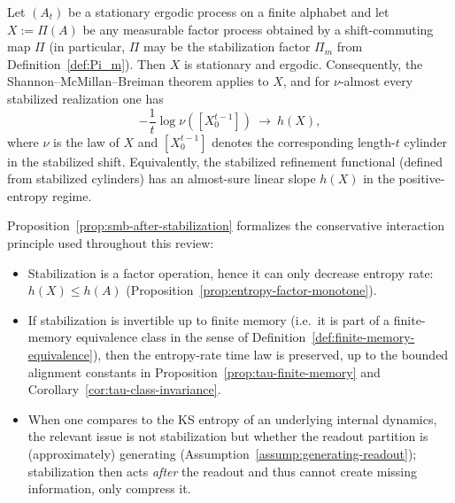 \begin{proposition}\label{prop:smb-after-stabilization}
Let $(A_t)$ be a stationary ergodic process on a finite alphabet and let \(X:=\Pi(A)\) be any measurable factor process obtained by a shift-commuting map \(\Pi\) (in particular, \(\Pi\) may be the stabilization factor \(\Pi_m\) from Definition~\ref{def:Pi_m}).
Then \(X\) is stationary and ergodic.
Consequently, the Shannon--McMillan--Breiman theorem applies to \(X\), and for \(\nu\)-almost every stabilized realization one has
\[
-\frac{1}{t}\log \nu([X_0^{t-1}])\ \longrightarrow\ h(X),
\]
where \(\nu\) is the law of \(X\) and \([X_0^{t-1}]\) denotes the corresponding length-\(t\) cylinder in the stabilized shift.
Equivalently, the stabilized refinement functional (defined from stabilized cylinders) has an almost-sure linear slope \(h(X)\) in the positive-entropy regime.
\end{proposition}

\begin{remark}\label{rem:stabilization-smb-ks}
Proposition~\ref{prop:smb-after-stabilization} formalizes the conservative interaction principle used throughout this review:
\begin{itemize}[leftmargin=*,itemsep=2pt]
  \item Stabilization is a factor operation, hence it can only decrease entropy rate: \(h(X)\le h(A)\) (Proposition~\ref{prop:entropy-factor-monotone}).
  \item If stabilization is invertible up to finite memory (i.e.\ it is part of a finite-memory equivalence class in the sense of Definition~\ref{def:finite-memory-equivalence}), then the entropy-rate time law is preserved, up to the bounded alignment constants in Proposition~\ref{prop:tau-finite-memory} and Corollary~\ref{cor:tau-class-invariance}.
  \item When one compares to the KS entropy of an underlying internal dynamics, the relevant issue is not stabilization but whether the readout partition is (approximately) generating (Assumption~\ref{assump:generating-readout}); stabilization then acts \emph{after} the readout and thus cannot create missing information, only compress it.
\end{itemize}
\end{remark}

